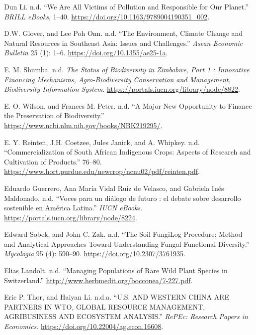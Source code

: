 \begin{CSLReferences}{1}{0}
Dun Li. n.d. {``We Are All Victims of Pollution and Responsible for Our
Planet.''} \emph{BRILL eBooks}, 1--40.
\url{https://doi.org/10.1163/9789004190351_002}.

D.W. Glover, and Lee Poh Onn. n.d. {``The Environment, Climate Change
and Natural Resources in Southeast Asia: Issues and Challenges.''}
\emph{Asean Economic Bulletin} 25 (1): 1--6.
\url{https://doi.org/10.1355/ae25-1a}.

E. M. Shumba. n.d. \emph{The Status of Biodiversity in Zimbabwe, Part 1
: Innovative Financing Mechanisms, Agro-Biodiversity Conservation and
Management, Biodiversity Information System}.
\url{https://portals.iucn.org/library/node/8822}.

E. O. Wilson, and Frances M. Peter. n.d. {``A Major New Opportunity to
Finance the Preservation of Biodiversity.''}
\url{https://www.ncbi.nlm.nih.gov/books/NBK219295/}.

E. Y. Reinten, J.H. Coetzee, Jules Janick, and A. Whipkey. n.d.
{``Commercialization of South African Indigenous Crops: Aspects of
Research and Cultivation of Products.''} 76--80.
\url{https://www.hort.purdue.edu/newcrop/ncnu02/pdf/reinten.pdf}.

Eduardo Guerrero, Ana María Vidal Ruiz de Velasco, and Gabriela Inés
Maldonado. n.d. {``Voces para un diálogo de futuro : el debate sobre
desarrollo sostenible en América Latina.''} \emph{IUCN eBooks}.
\url{https://portals.iucn.org/library/node/8224}.

Edward Sobek, and John C. Zak. n.d. {``The Soil FungiLog Procedure:
Method and Analytical Approaches Toward Understanding Fungal Functional
Diversity.''} \emph{Mycologia} 95 (4): 590--90.
\url{https://doi.org/10.2307/3761935}.

Elias Landolt. n.d. {``Managing Populations of Rare Wild Plant Species
in Switzerland.''} \url{http://www.herbmedit.org/bocconea/7-227.pdf}.

Eric P. Thor, and Haiyan Li. n.d.a. {``U.S. AND WESTERN CHINA ARE
PARTNERS IN WTO, GLOBAL RESOURCE MANAGEMENT, AGRIBUSINESS AND ECOSYSTEM
ANALYSIS.''} \emph{RePEc: Research Papers in Economics}.
\url{https://doi.org/10.22004/ag.econ.16608}.


\end{CSLReferences}
